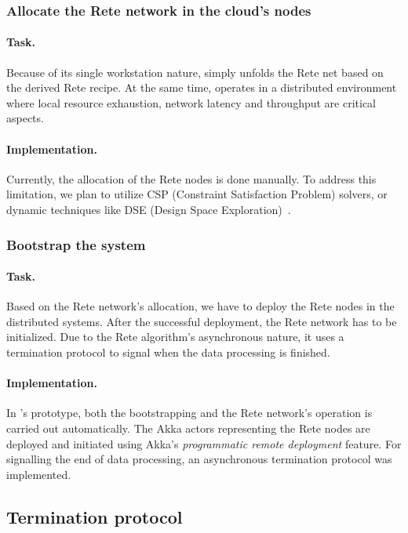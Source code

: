 \subsubsection{Allocate the Rete network in the cloud's nodes} 

\paragraph{Task.} Because of its single workstation nature, \eiq{} simply unfolds the Rete net based on the derived Rete recipe. At the same time, \iqd{} operates in a distributed environment where local resource exhaustion, network latency and throughput are critical aspects. 

\paragraph{Implementation.} Currently, the allocation of the Rete nodes is done manually. To address this limitation, we plan to utilize CSP (Constraint Satisfaction Problem) solvers, or dynamic techniques like DSE (Design Space Exploration)~\cite{DSE11}. 

\subsubsection{Bootstrap the system}

\paragraph{Task.} Based on the Rete network's allocation, we have to deploy the Rete nodes in the distributed systems. After the successful deployment, the Rete network has to be initialized. Due to the Rete algorithm's asynchronous nature, it uses a termination protocol to signal when the data processing is finished. 

\paragraph{Implementation.} In \iqd{}'s prototype, both the bootstrapping and the Rete network's operation is carried out automatically. The Akka actors representing the Rete nodes are deployed and initiated using Akka's \textit{programmatic remote deployment} feature. For signalling the end of data processing, an asynchronous termination protocol was implemented. 


\subsection{Termination protocol}

